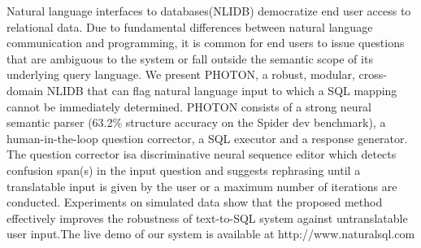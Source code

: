 Natural language   interfaces   to   databases(NLIDB)  democratize  end  user  access  to  relational data.  Due to fundamental differences between natural language communication and programming,  it is common for end users to issue questions that are ambiguous to the system  or  fall  outside  the  semantic  scope  of  its underlying query language.  We present PHOTON, a robust, modular, cross-domain NLIDB that can flag natural language input to which a SQL mapping cannot be immediately determined.   PHOTON consists  of  a  strong  neural semantic parser (63.2\% structure accuracy on the  Spider  dev  benchmark),  a  human-in-the-loop question corrector, a SQL executor and a response generator.  The question corrector isa discriminative neural sequence editor which detects confusion span(s) in the input question and suggests rephrasing until a translatable input is given by the user or a maximum number of  iterations  are  conducted.   Experiments  on simulated data show that the proposed method effectively improves the robustness of text-to-SQL system against untranslatable user input.The live demo of our system is available at http://www.naturalsql.com
